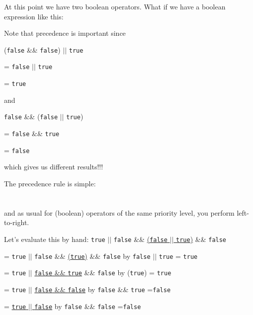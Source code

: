 
  

At this point we have two boolean operators. What if we have a boolean expression like this:


Note that precedence is important since

(\verb!false! \&\& \verb!false!) $||$ \verb!true!

= \verb!false! $||$ \verb!true!

= \verb!true!

and

\verb!false! \&\& (\verb!false! $||$ \verb!true!)

= \verb!false! \&\& \verb!true!

= \verb!false!

which gives us different results!!!

The precedence rule is simple:
\\
\tab[9em]{\&\&}\\
\\

and as usual for (boolean) operators of the same priority level, you perform left-to-right.

Let's evaluate this by hand:
\texttt{true} $||$ \texttt{false} \&\& \underline{(\texttt{false} $||$ \texttt{true})} \&\& \texttt{false}

= \texttt{true} $||$ \texttt{false} \&\& \underline{(\texttt{true})} \&\& \texttt{false} by \texttt{false} $||$ \texttt{true} = \texttt{true}

= \texttt{true} $||$ \underline{\texttt{false} \&\& \texttt{true}} \&\& \texttt{false}   by (\texttt{true}) = \texttt{true}

= \texttt{true} $||$ \underline{\texttt{false} \&\& \texttt{false}}           by \texttt{false} \&\& \texttt{true} =\texttt{false}

= \underline{\texttt{true} $||$ \texttt{false}}                    by \texttt{false} \&\& \texttt{false} =\texttt{false}

